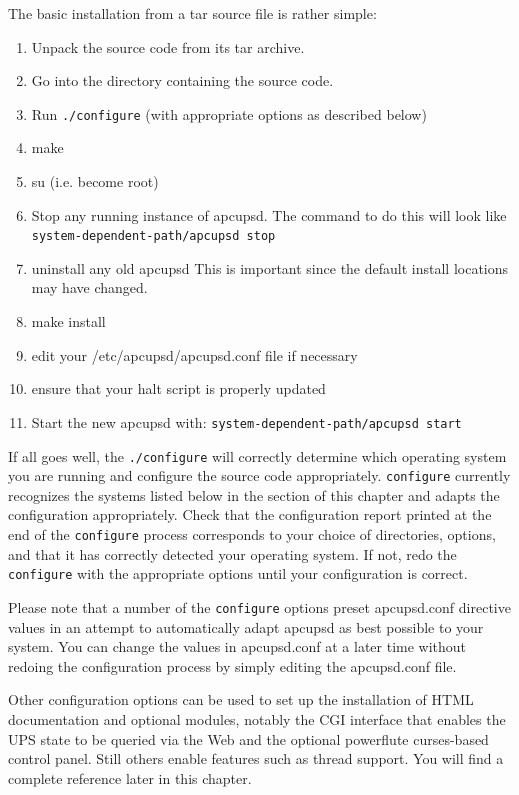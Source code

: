 The basic installation from a tar source file is rather simple:  

\begin{enumerate}
\item Unpack the source code from its tar archive.  
\item Go into the directory containing the source code.  
\item Run {\tt ./configure} (with appropriate options as described below)  
\item make  
\item su (i.e. become root)  
\item Stop any running instance of apcupsd.  The command to do this will look
like {\tt \lt{}system-dependent-path\gt{}/apcupsd stop}  
\item uninstall any old apcupsd This is important since the default install
locations may have changed.  
\item make install  
\item edit your /etc/apcupsd/apcupsd.conf file if necessary  
\item ensure that your halt script is properly updated  
\item Start the new apcupsd with: {\tt \lt{}system-dependent-path\gt{}/apcupsd
start}  
\end{enumerate}

If all goes well, the {\tt ./configure} will correctly determine which
operating system you are running and configure the source code appropriately.
{\tt configure} currently recognizes the systems listed below in the 
section of this chapter and adapts the configuration appropriately.  Check
that the configuration report printed at the end of the {\tt configure}
process corresponds to your choice of directories, options, and that it has
correctly detected your operating system.  If not, redo the {\tt configure}
with the appropriate options until your configuration is correct.  

Please note that a number of the {\tt configure} options preset apcupsd.conf
directive values in an attempt to automatically adapt apcupsd as best possible
to your system.  You can change the values in apcupsd.conf at a later time
without redoing the configuration process by simply editing the apcupsd.conf
file.  

Other configuration options can be used to set up the installation of HTML
documentation and optional modules, notably the CGI interface that enables the
UPS state to be queried via the Web and the optional powerflute curses-based
control panel.  Still others enable features such as thread support.  You will
find a complete reference later in this chapter.  

